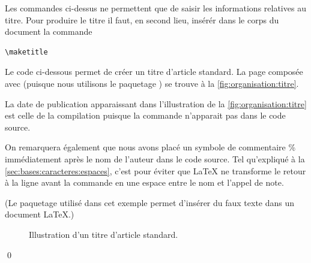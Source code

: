 Les commandes ci-dessus ne permettent que de saisir les informations
relatives au titre. Pour produire le titre il faut, en second lieu,
insérér dans le corps du document la commande
\begin{lstlisting}
\maketitle
\end{lstlisting}

\begin{exemple}
  \label{ex:organisation:titre}
  Le code ci-dessous permet de créer un titre d'article standard. La
  page composée avec {\XeLaTeX} (puisque nous utilisons le paquetage
  ) se trouve à la \autoref{fig:organisation:titre}.
  \begin{demo}
    
  \end{demo}

  La date de publication apparaissant dans l'illustration de la
  \autoref*{fig:organisation:titre} est celle de la compilation
  puisque la commande \cmdprint{\date} n'apparait pas dans le code
  source.

  On remarquera également que nous avons placé un symbole de
  commentaire \% immédiatement après le nom de l'auteur dans le code
  source. Tel qu'expliqué à la \autoref{sec:bases:caracteres:espaces},
  c'est pour éviter que {\LaTeX} ne transforme le retour à la ligne avant
  la commande \cmd{\thanks} en une espace entre le nom et l'appel de
  note.

  (Le paquetage  utilisé dans cet exemple permet
  d'insérer du faux texte 
  dans un document \LaTeX.)
  \begin{figure}
    \centering
    \caption{Illustration d'un titre d'article standard.}
    \label{fig:organisation:titre}
  \end{figure}
  \qed
\end{exemple}

